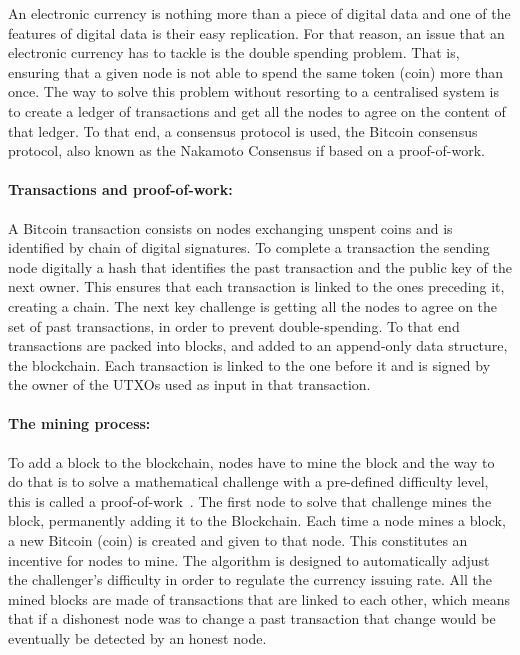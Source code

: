An electronic currency is nothing more than a piece of digital data and one of the features of digital data is their easy replication. For that reason, an issue that an electronic currency has to tackle is the double spending problem. That is, ensuring that a given node is not able to spend the same token (coin) more than once. The way to solve this problem without resorting to a centralised system is to create a ledger of transactions and get all the nodes to agree on the content of that ledger. To that end, a consensus protocol is used, the Bitcoin consensus protocol, also known as the Nakamoto Consensus if based on a proof-of-work.

\paragraph{Transactions and proof-of-work:} A Bitcoin transaction consists on nodes exchanging unspent coins and is identified by chain of digital signatures. To complete a transaction the sending node digitally a hash that identifies the past transaction and the public key of the next owner. This ensures that each transaction is linked to the ones preceding it, creating a chain.
The next key challenge is getting all the nodes to agree on the set of past transactions, in order to prevent double-spending.
To that end transactions are packed into blocks, and added to an append-only data structure, the blockchain. Each transaction is linked to the one before it and is signed by the owner of the UTXOs used as input in that transaction.

\paragraph{The mining process:} To add a block to the blockchain, nodes have to mine the block and the way to do that is to solve a mathematical challenge with a pre-defined difficulty level, this is called a proof-of-work~\cite{Gervais:2016dd}. The first node to solve that challenge mines the block, permanently adding it to the Blockchain. Each time a node mines a block, a new Bitcoin (coin) is created and given to that node. This constitutes an incentive for nodes to mine. The algorithm is designed to automatically adjust the challenger's difficulty in order to regulate the currency issuing rate. All the mined blocks are made of transactions that are linked to each other, which means that if a dishonest node was to change a past transaction that change would be eventually be detected by an honest node.

